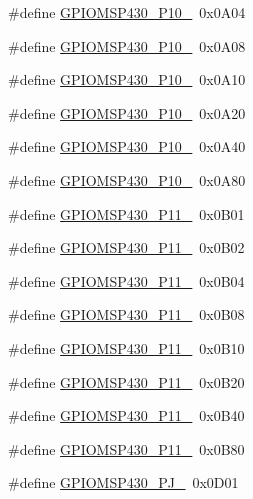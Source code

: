 \begin{DoxyCompactItemize}
\item 
\#define \hyperlink{_g_p_i_o_m_s_p430_8h_a2954b11c3cdc91ccd3fd64cf582d39ad}{G\+P\+I\+O\+M\+S\+P430\+\_\+\+P10\+\_}~0x0\+A04
\item 
\#define \hyperlink{_g_p_i_o_m_s_p430_8h_a1d68e25424afa1e4b394335d748049f0}{G\+P\+I\+O\+M\+S\+P430\+\_\+\+P10\+\_}~0x0\+A08
\item 
\#define \hyperlink{_g_p_i_o_m_s_p430_8h_a1f1e028f9de45c6652b0ffd927a07bc4}{G\+P\+I\+O\+M\+S\+P430\+\_\+\+P10\+\_}~0x0\+A10
\item 
\#define \hyperlink{_g_p_i_o_m_s_p430_8h_a847c35f530cd2661cc32f69e7851bf14}{G\+P\+I\+O\+M\+S\+P430\+\_\+\+P10\+\_}~0x0\+A20
\item 
\#define \hyperlink{_g_p_i_o_m_s_p430_8h_aa6797c3f14188bfb74a0d27531e41960}{G\+P\+I\+O\+M\+S\+P430\+\_\+\+P10\+\_}~0x0\+A40
\item 
\#define \hyperlink{_g_p_i_o_m_s_p430_8h_aa3462399ed6d6a003c064ab39a81affc}{G\+P\+I\+O\+M\+S\+P430\+\_\+\+P10\+\_}~0x0\+A80
\item 
\#define \hyperlink{_g_p_i_o_m_s_p430_8h_a868043e61ad41d7f4a52272b2a98b8fb}{G\+P\+I\+O\+M\+S\+P430\+\_\+\+P11\+\_}~0x0\+B01
\item 
\#define \hyperlink{_g_p_i_o_m_s_p430_8h_acff1501f151b6586b2e1a8777b2a486c}{G\+P\+I\+O\+M\+S\+P430\+\_\+\+P11\+\_}~0x0\+B02
\item 
\#define \hyperlink{_g_p_i_o_m_s_p430_8h_a0df917fdb462cec097b6b89ed3de92a3}{G\+P\+I\+O\+M\+S\+P430\+\_\+\+P11\+\_}~0x0\+B04
\item 
\#define \hyperlink{_g_p_i_o_m_s_p430_8h_af8e292289321cacb24b8c26e7a2ba971}{G\+P\+I\+O\+M\+S\+P430\+\_\+\+P11\+\_}~0x0\+B08
\item 
\#define \hyperlink{_g_p_i_o_m_s_p430_8h_a4b0005d8525d0e7aeb0155ad17f6d2e5}{G\+P\+I\+O\+M\+S\+P430\+\_\+\+P11\+\_}~0x0\+B10
\item 
\#define \hyperlink{_g_p_i_o_m_s_p430_8h_a37819393dd48e176cdf4a7a992450748}{G\+P\+I\+O\+M\+S\+P430\+\_\+\+P11\+\_}~0x0\+B20
\item 
\#define \hyperlink{_g_p_i_o_m_s_p430_8h_adb7971e23c796d62133575d844b3980c}{G\+P\+I\+O\+M\+S\+P430\+\_\+\+P11\+\_}~0x0\+B40
\item 
\#define \hyperlink{_g_p_i_o_m_s_p430_8h_ab0904dfeef3b6d20baa0bd4d2d1c398d}{G\+P\+I\+O\+M\+S\+P430\+\_\+\+P11\+\_}~0x0\+B80
\item 
\#define \hyperlink{_g_p_i_o_m_s_p430_8h_a07980790210837f2793a13c185e73edc}{G\+P\+I\+O\+M\+S\+P430\+\_\+\+P\+J\+\_}~0x0\+D01

\end{DoxyCompactItemize}
